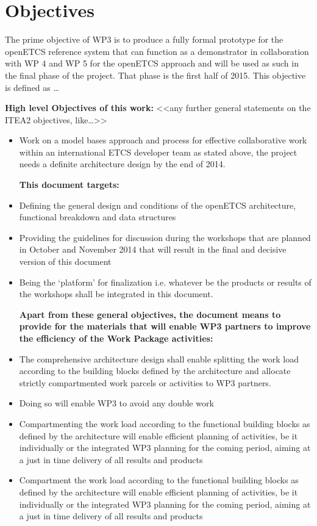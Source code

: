\section{Objectives}
The prime objective of WP3 is to produce a fully formal prototype for the openETCS reference system that can function as a demonstrator in collaboration with WP 4 and WP 5  for the openETCS approach and will be used as such in the final phase of the project. That phase is the first half of 2015.  This objective is defined as … 

\textbf{High level Objectives of this work:}
<<any further general statements on the ITEA2  objectives, like…>>\\

\begin{itemize}
\item Work on a model bases approach and process for effective collaborative work within an international ETCS developer team as stated above, the project needs a definite architecture design by the end of 2014.

\textbf{This document targets:}
\item Defining the general design and conditions of the openETCS architecture, functional breakdown and data structures
\item Providing the guidelines for discussion during the workshops that are planned in October and November 2014 that will result in the final and decisive version of this document
\item Being the ‘platform’ for finalization i.e. whatever be the products or results of the workshops shall be integrated in this document.

\textbf{Apart from these general objectives, the document means to provide for the materials that will enable WP3 partners to improve the efficiency of the Work Package activities:}
\item The comprehensive architecture design shall enable splitting the work load according to the building blocks defined by the architecture and allocate strictly compartmented work parcels or activities to WP3 partners.
\item Doing so will enable WP3 to avoid any double work
\item  Compartmenting the work load according to the functional building blocks as defined by the architecture will enable efficient planning of activities, be it individually or the integrated WP3 planning for the coming period, aiming at a just in time delivery of all results and products
\item  Compartment the work load according to the functional building blocks as defined by the architecture will enable efficient planning of activities, be it individually or the integrated WP3 planning for the coming period, aiming at a just in time delivery of all results and products
\end{itemize}

